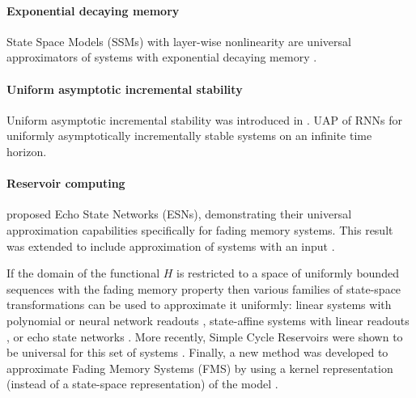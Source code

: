 \documentclass{article}
\theoremstyle{definition}
\theoremstyle{remark}
\newcounter{ct}
\begin{document}
\paragraph{Exponential decaying memory}
State Space Models (SSMs) with layer-wise nonlinearity are universal approximators of systems with exponential decaying memory \citep{wang2024state}.


\paragraph{Uniform asymptotic incremental stability}
Uniform asymptotic incremental stability was introduced in \citep{pavlov2006uniform}.
UAP of RNNs for uniformly asymptotically incrementally stable systems on an infinite time horizon\citep{hanson2020universal, hanson2021learning}.


\paragraph{Reservoir computing}
\citet{jaeger2001echo} proposed Echo State Networks (ESNs), demonstrating their universal approximation capabilities specifically for fading memory systems.
This result was extended to include approximation of systems with an input \citep{manjunath2013echo}.

If the domain of the functional $H$ is restricted to a space of uniformly bounded sequences with the fading memory property then various families of state-space transformations can be used to approximate it uniformly: 
 linear systems with polynomial or neural network readouts \citep{boyd1985fading,grigoryeva2018universal,gonon2019reservoir}, state-affine systems with linear readouts \citep{grigoryeva2018universal}, or echo state networks \citep{grigoryeva2018echo,gonon2019reservoir,gonon2021fading,gonon2023approximation}.
 More recently, Simple Cycle Reservoirs were shown to be universal for this set of systems \citep{li2023simple}.
Finally, a new method was developed to approximate Fading Memory Systems (FMS) by using a kernel representation (instead of a state-space representation) of the model \citep{huo2024kernel}. %
\end{document}
